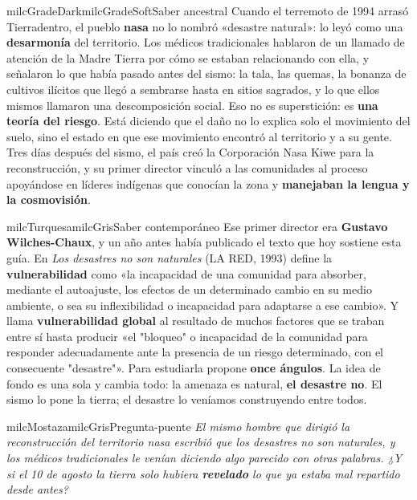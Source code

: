 \documentclass[11pt,letterpaper]{article}
\begin{document}
\begin{softbox}{milcGradeDark}{milcGradeSoft}{Saber ancestral}
Cuando el terremoto de 1994 arrasó Tierradentro, el pueblo \textbf{nasa} no lo nombró «desastre natural»: lo leyó como una \textbf{desarmonía} del territorio. Los médicos tradicionales hablaron de un llamado de atención de la Madre Tierra por cómo se estaban relacionando con ella, y señalaron lo que había pasado antes del sismo: la tala, las quemas, la bonanza de cultivos ilícitos que llegó a sembrarse hasta en sitios sagrados, y lo que ellos mismos llamaron una descomposición social. Eso no es superstición: es \textbf{una teoría del riesgo}. Está diciendo que el daño no lo explica solo el movimiento del suelo, sino el estado en que ese movimiento encontró al territorio y a su gente. Tres días después del sismo, el país creó la Corporación Nasa Kiwe para la reconstrucción, y su primer director vinculó a las comunidades al proceso apoyándose en líderes indígenas que conocían la zona y \textbf{manejaban la lengua y la cosmovisión}.
\end{softbox}

\begin{softbox}{milcTurquesa}{milcGris}{Saber contemporáneo}
Ese primer director era \textbf{Gustavo Wilches-Chaux}, y un año antes había publicado el texto que hoy sostiene esta guía. En \emph{Los desastres no son naturales} (LA RED, 1993) define la \textbf{vulnerabilidad} como «la incapacidad de una comunidad para absorber, mediante el autoajuste, los efectos de un determinado cambio en su medio ambiente, o sea su inflexibilidad o incapacidad para adaptarse a ese cambio». Y llama \textbf{vulnerabilidad global} al resultado de muchos factores que se traban entre sí hasta producir «el "bloqueo" o incapacidad de la comunidad para responder adecuadamente ante la presencia de un riesgo determinado, con el consecuente "desastre"». Para estudiarla propone \textbf{once ángulos}. La idea de fondo es una sola y cambia todo: la amenaza es natural, \textbf{el desastre no}. El sismo lo pone la tierra; el desastre lo veníamos construyendo entre todos.
\end{softbox}

\begin{softbox}{milcMostaza}{milcGris}{Pregunta-puente}
\textit{El mismo hombre que dirigió la reconstrucción del territorio nasa escribió que los desastres no son naturales, y los médicos tradicionales le venían diciendo algo parecido con otras palabras. ¿Y si el 10 de agosto la tierra solo hubiera \textbf{revelado} lo que ya estaba mal repartido desde antes?}
\end{softbox}
\end{document}
